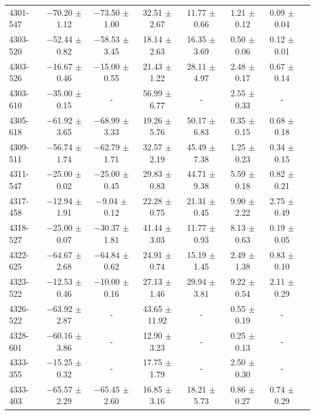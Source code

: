 \documentclass[a4paper,fleqn,usenatbib]{mnras}     %
\begin{document}
\begin{longtable}{l c c c c c c c }
4301-547   &   $-$70.20 $\pm$ 1.12   &   $-$73.50 $\pm$ 1.00   &    32.51 $\pm$ 2.67   &  11.77 $\pm$ 0.66   &   1.21 $\pm$ 0.12   &   0.09 $\pm$ 0.04  \\
4303-520   &   $-$52.44 $\pm$ 0.82   &   $-$58.53 $\pm$ 3.45   &    18.14 $\pm$ 2.63   &  16.35 $\pm$ 3.69   &   0.50 $\pm$ 0.06   &   0.12 $\pm$ 0.01  \\
4303-526   &   $-$16.67 $\pm$ 0.46   &   $-$15.00 $\pm$ 0.55   &    21.43 $\pm$ 1.22   &  28.11 $\pm$ 4.97   &   2.48 $\pm$ 0.17   &   0.67 $\pm$ 0.14  \\
4303-610   &   $-$35.00 $\pm$ 0.15   &     -   &    56.99 $\pm$ 6.77   &   -   &   2.55 $\pm$ 0.33   &   -  \\
4305-618   &   $-$61.92 $\pm$ 3.65   &   $-$68.99 $\pm$ 3.33   &    19.26 $\pm$ 5.76   &  50.17 $\pm$ 6.83   &   0.35 $\pm$ 0.15   &   0.68 $\pm$ 0.18  \\
4309-511   &   $-$56.74 $\pm$ 1.74   &   $-$62.79 $\pm$ 1.71   &    32.57 $\pm$ 2.19   &  45.49 $\pm$ 7.38   &   1.25 $\pm$ 0.23   &   0.34 $\pm$ 0.15  \\
4311-547   &   $-$25.00 $\pm$ 0.02   &   $-$25.00 $\pm$ 0.45   &    29.83 $\pm$ 0.83   &  44.71 $\pm$ 9.38   &   5.59 $\pm$ 0.18   &   0.82 $\pm$ 0.21  \\
4317-458   &   $-$12.94 $\pm$ 1.91   &    $-$9.04 $\pm$ 0.12   &    22.28 $\pm$ 0.75   &  21.31 $\pm$ 0.45   &   9.90 $\pm$ 2.22   &   2.75 $\pm$ 0.49  \\
4318-527   &   $-$25.00 $\pm$ 0.07   &   $-$30.37 $\pm$ 1.81   &    41.44 $\pm$ 3.03   &  11.77 $\pm$ 0.93   &   8.13 $\pm$ 0.63   &   0.19 $\pm$ 0.05  \\
4322-625   &   $-$64.67 $\pm$ 2.68   &   $-$64.84 $\pm$ 0.62   &    24.91 $\pm$ 0.74   &  15.19 $\pm$ 1.45   &   2.49 $\pm$ 1.38   &   0.83 $\pm$ 0.10  \\
4323-522   &   $-$12.53 $\pm$ 0.46   &   $-$10.00 $\pm$ 0.16   &    27.13 $\pm$ 1.46   &  29.94 $\pm$ 3.81   &   9.22 $\pm$ 0.54   &   2.11 $\pm$ 0.29  \\
4326-522   &   $-$63.92 $\pm$ 2.87   &     -   &    43.65 $\pm$11.92   &   -   &   0.55 $\pm$ 0.19   &   -  \\
4328-601   &   $-$60.16 $\pm$ 3.86   &     -   &    12.90 $\pm$ 3.23   &   -   &   0.25 $\pm$ 0.13   &   -  \\
4333-355   &   $-$15.25 $\pm$ 0.32   &     -   &    17.75 $\pm$ 1.79   &   -   &   2.50 $\pm$ 0.30   &   -  \\
4333-403   &   $-$65.57 $\pm$ 2.29   &   $-$65.45 $\pm$ 2.60   &    16.85 $\pm$ 3.16   &  18.21 $\pm$ 5.73   &   0.86 $\pm$ 0.27   &   0.74 $\pm$ 0.29  \\

\end{longtable}
\end{document}
